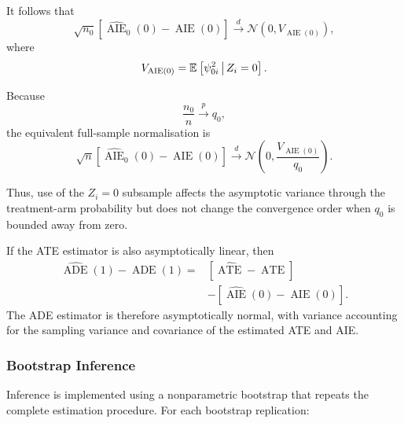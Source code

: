 It follows that
\[
    \sqrt{n_0}
    \left[
        \widehat{\operatorname{AIE}}_0(0)
        -
        \operatorname{AIE}(0)
    \right]
    \overset{d}{\longrightarrow}
    \mathcal N
    \left(
        0,
        V_{\operatorname{AIE}(0)}
    \right),
    \label{eqn:aie0-root-n0-normality}
\]
where
\[
    V_{\operatorname{AIE}(0)}
    =
    \mathbb{E}_{} \left[ 
        \psi_{0i}^2
     \, \middle\vert \, 
        Z_i=0
     \right].
\]

Because
\[
    \frac{n_0}{n}
    \overset{p}{\longrightarrow}
    q_0,
\]
the equivalent full-sample normalisation is
\[
    \sqrt n
    \left[
        \widehat{\operatorname{AIE}}_0(0)
        -
        \operatorname{AIE}(0)
    \right]
    \overset{d}{\longrightarrow}
    \mathcal N
    \left(
        0,
        \frac{
            V_{\operatorname{AIE}(0)}
        }{
            q_0
        }
    \right).
    \label{eqn:aie0-root-n-normality}
\]

Thus, use of the $Z_i=0$ subsample affects the asymptotic variance through the treatment-arm probability but does not change the convergence order when $q_0$ is bounded away from zero.

If the ATE estimator is also asymptotically linear, then
\[
    \begin{aligned}
    \widehat{\operatorname{ADE}}(1)
    -
    \operatorname{ADE}(1)
    ={}&
    \left[
        \widehat{\operatorname{ATE}}
        -
        \operatorname{ATE}
    \right]
    \\
    &-
    \left[
        \widehat{\operatorname{AIE}}(0)
        -
        \operatorname{AIE}(0)
    \right].
    \end{aligned}
\]
The ADE estimator is therefore asymptotically normal, with variance accounting for the sampling variance and covariance of the estimated ATE and AIE.

\subsubsection{Bootstrap Inference}

Inference is implemented using a nonparametric bootstrap that repeats the complete estimation procedure.
For each bootstrap replication:

